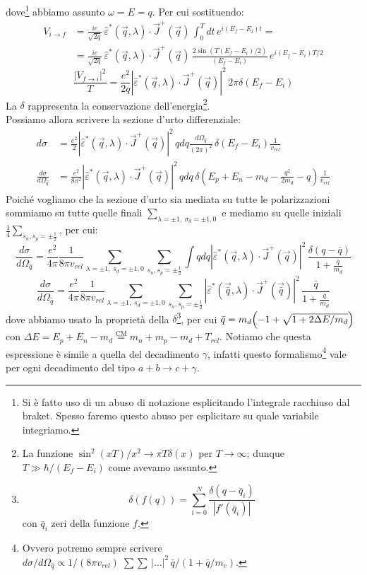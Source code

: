dove\footnote{Si è fatto uso di un abuso di notazione esplicitando l'integrale racchiuso dal braket. Spesso faremo questo abuso per esplicitare su quale variabile integriamo.} abbiamo assunto $\omega = E = q$. Per cui sostituendo:
\begin{align*}
    V_{i\to f} &= \frac{ie}{\sqrt{2q}}\,\widehat{\varepsilon}^*(\vec{q},\lambda) \cdot \vec{J}^+(\vec{q})\, \int_0^T dt \, e^{i(E_f-E_i)t} = \\
    &= \frac{ie}{\sqrt{2q}}\,\widehat{\varepsilon}^*(\vec{q},\lambda) \cdot \vec{J}^+(\vec{q})\,\frac{2\sin{(T (E_f-E_i)/2)}}{(E_f-E_i)} \, e^{i(E_f-E_i)T/2}
\end{align*}
$$\frac{|V_{f\to i}|^2}{T} = \frac{e^2}{2q} |\widehat{\varepsilon}^*(\vec{q},\lambda) \cdot \vec{J}^+(\vec{q})|^2\, 2\pi \delta(E_f - E_i)$$
La $\delta$ rappresenta la conservazione dell'energia\footnote{La funzione $\sin^2(xT)/x^2 \to \pi T \delta(x)$ per $T\to\infty$; dunque $T\gg \hbar/(E_f-E_i)$ come avevamo assunto.}.\\
Possiamo allora scrivere la sezione d'urto differenziale:
\begin{displaymath}
\begin{aligned}
d\sigma &= \frac{e^2}{2} |\widehat{\varepsilon}^*(\vec{q},\lambda) \cdot \vec{J}^+(\vec{q})|^2\, q dq \frac{d\Omega_{\hat{q}}}{(2\pi)^2}\, \delta(E_f - E_i) \frac{1}{v_{rel}} \\
\frac{d\sigma}{d\Omega_{\hat{q}}} &= \frac{e^2}{8\pi^2} |\widehat{\varepsilon}^*(\vec{q},\lambda) \cdot \vec{J}^+(\vec{q})|^2\, q dq \, \delta(E_p + E_n - m_d - \frac{q^2}{2m_d}-q) \frac{1}{v_{rel}}
\end{aligned}
\end{displaymath}
Poiché vogliamo che la sezione d'urto sia mediata su tutte le polarizzazioni sommiamo su tutte quelle finali $\sum_{\lambda=\pm 1 ,\; \sigma_d = \pm 1, 0}$ e mediamo su quelle iniziali $\frac{1}{4}\sum_{s_n,s_p = \pm \frac{1}{2}}$, per cui:
$$\frac{d\sigma}{d\Omega_{\hat{q}}} = \frac{e^2}{4\pi}\frac{1}{8\pi v_{rel}}\sum_{\lambda=\pm 1 ,\; s_d = \pm 1, 0} \sum_{s_n,s_p = \pm \frac{1}{2}} \int q dq |\widehat{\varepsilon}^*(\vec{q},\lambda) \cdot \vec{J}^+(\vec{q})|^2\,\frac{\delta (q-\bar{q})}{1+\frac{\bar{q}}{m_d}}$$
$$\frac{d\sigma}{d\Omega_{\hat{q}}}=\frac{e^2}{4\pi}\frac{1}{8\pi v_{rel}}\sum_{\lambda=\pm 1 ,\; s_d = \pm 1, 0} \sum_{s_n,s_p = \pm \frac{1}{2}}  |\widehat{\varepsilon}^*(\vec{\bar{q}},\lambda) \cdot \vec{J}^+(\vec{\bar{q}})|^2\,\frac{\bar{q}}{1+\frac{\bar{q}}{m_d}}$$
dove abbiamo usato la proprietà della $\delta$\footnote{$$\delta (f(q)) = \sum_{i=0}^N\frac{\delta(q-\bar{q}_i)}{|f'(\bar{q}_i)|}$$
con $\bar{q}_i$ zeri della funzione $f$.}, per cui $\bar{q} = m_d \Bigl ( -1+ \sqrt{1+2\Delta E/m_d} \Bigr )$ con $\Delta E = E_p + E_n - m_d \overset{\text{CM}}{=} m_n+m_p-m_d + T_{rel}$. Notiamo che questa espressione è simile a quella del decadimento $\gamma$, infatti questo formalismo\footnote{Ovvero potremo sempre scrivere ${d\sigma}/{d\Omega_{\hat{q}}} \propto 1/(8\pi v_{rel})\; \sum \sum \, |\dots|^2\, {\bar{q}}/{(1+\bar{q}/m_c)}$.} vale per ogni decadimento del tipo $a+b\to c +\gamma$.\\
